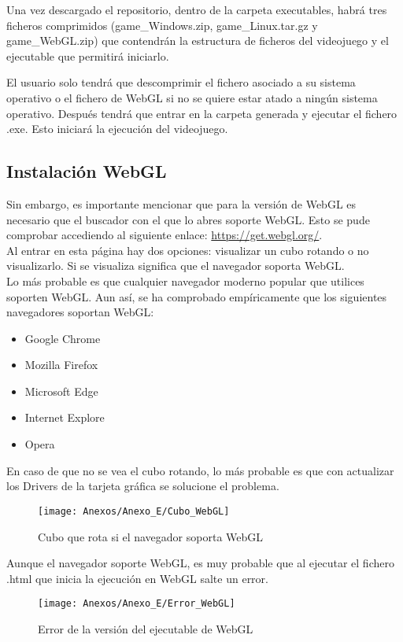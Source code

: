 Una vez descargado el repositorio, dentro de la carpeta executables, habrá tres ficheros comprimidos (game\_Windows.zip, game\_Linux.tar.gz y game\_WebGL.zip) que contendrán la estructura de ficheros del videojuego y el ejecutable que permitirá iniciarlo.

El usuario solo tendrá que descomprimir el fichero asociado a su sistema operativo o el fichero de WebGL si no se quiere estar atado a ningún sistema operativo. Después tendrá que entrar en la carpeta generada y ejecutar el fichero .exe. Esto iniciará la ejecución del videojuego.

\subsection{Instalación WebGL}
Sin embargo, es importante mencionar que para la versión de WebGL es necesario que el buscador con el que lo abres soporte WebGL. Esto se pude comprobar accediendo al siguiente enlace: \url{https://get.webgl.org/}.\\ 
Al entrar en esta página hay dos opciones: visualizar un cubo rotando o no visualizarlo. Si se visualiza significa que el navegador soporta WebGL.\\
Lo más probable es que cualquier navegador moderno popular que utilices soporten WebGL. Aun así, se ha comprobado empíricamente que los siguientes navegadores soportan WebGL:
\begin{itemize}
\item
Google Chrome
\item
Mozilla Firefox
\item
Microsoft Edge
\item
Internet Explore
\item
Opera
\end{itemize}

En caso de que no se vea el cubo rotando, lo más probable es que con actualizar los Drivers de la tarjeta gráfica se solucione el problema.

\clearpage
\begin{figure}[h]
\centering
\texttt{[image: Anexos/Anexo\_E/Cubo\_WebGL]}
\caption{Cubo que rota si el navegador soporta WebGL}
\end{figure}

Aunque el navegador soporte WebGL, es muy probable que al ejecutar el fichero .html que inicia la ejecución en WebGL salte un error.

\begin{figure}[h]
\centering
\texttt{[image: Anexos/Anexo\_E/Error\_WebGL]}
\caption{Error de la versión del ejecutable de WebGL}
\end{figure}

